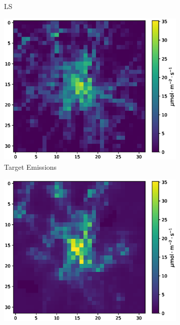 \begin{figure}[htb]
\begin{minipage}[b]{\textwidth}
\begin{subfigure}[b]{0.32\textwidth}
            \caption{LS}
        \end{subfigure}
        \caption{Estimated 2018 Munich Emission Flux Fields after Atmospheric Inversion with Different Solvers at SNR = 20dB}
        \label{fig:example_munich_20_dB}
    \end{minipage}
    \begin{minipage}[b]{\textwidth}
        \centering
        \begin{subfigure}[b]{0.32\textwidth}
            \includegraphics[width=\textwidth]{figures/06_results/gaussian_plume_example/munich/target.eps}
            \caption{Target Emissions}
        \end{subfigure}
        \begin{subfigure}[b]{0.32\textwidth}
            \includegraphics[width=\textwidth]{figures/06_results/gaussian_plume_example/munich/gen_2048_fine_tuned_snr_5_db.eps}

\end{subfigure}
\end{minipage}
\end{figure}
